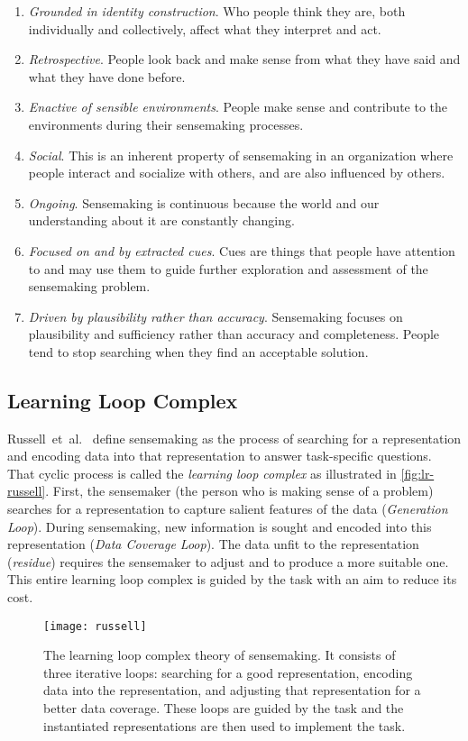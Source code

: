 \begin{enumerate}
	\item \emph{Grounded in identity construction}. Who people think they are, both individually and collectively, affect what they interpret and act.
	\item \emph{Retrospective}. People look back and make sense from what they have said and what they have done before.
	\item \emph{Enactive of sensible environments}. People make sense and contribute to the environments during their sensemaking processes.
	\item \emph{Social}. This is an inherent property of sensemaking in an organization where people interact and socialize with others, and are also influenced by others.
	\item \emph{Ongoing}. Sensemaking is continuous because the world and our understanding about it are constantly changing.
	\item \emph{Focused on and by extracted cues}. Cues are things that people have attention to and may use them to guide further exploration and assessment of the sensemaking problem.
	\item \emph{Driven by plausibility rather than accuracy}. Sensemaking focuses on plausibility and sufficiency rather than accuracy and completeness. People tend to stop searching when they find an acceptable solution.
\end{enumerate}

\subsection{Learning Loop Complex}
Russell~et~al.~\cite{Russell1993} define sensemaking as the process of searching for a representation and encoding data into that representation to answer task-specific questions. That cyclic process is called the \emph{learning loop complex} as illustrated in \autoref{fig:lr-russell}. First, the sensemaker (the person who is making sense of a problem) searches for a representation to capture salient features of the data (\emph{Generation Loop}). During sensemaking, new information is sought and encoded into this representation (\emph{Data Coverage Loop}). The data unfit to the representation (\emph{residue}) requires the sensemaker to adjust and to produce a more suitable one. This entire learning loop complex is guided by the task with an aim to reduce its cost.

\begin{figure}
	\centering
	\texttt{[image: russell]}
	\caption[The learning loop complex theory of sensemaking]{The learning loop complex theory of sensemaking. It consists of three iterative loops: searching for a good representation, encoding data into the representation, and adjusting that representation for a better data coverage. These loops are guided by the task and the instantiated representations are then used to implement the task. }
	\label{fig:lr-russell}
\end{figure}

